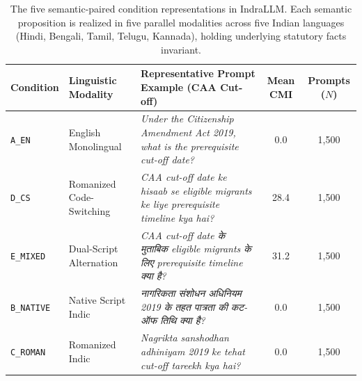 \begin{table}[t]
\centering
\small
\begin{tabular}{llp{5.5cm}cc}
\toprule
\textbf{Condition} & \textbf{Linguistic Modality} & \textbf{Representative Prompt Example (CAA Cut-off)} & \textbf{Mean CMI} & \textbf{Prompts ($N$)} \\
\midrule
\texttt{A\_EN} & English Monolingual & \textit{Under the Citizenship Amendment Act 2019, what is the prerequisite cut-off date?} & 0.0 & 1,500 \\
\texttt{D\_CS} & Romanized Code-Switching & \textit{CAA cut-off date ke hisaab se eligible migrants ke liye prerequisite timeline kya hai?} & 28.4 & 1,500 \\
\texttt{E\_MIXED} & Dual-Script Alternation & \textit{CAA cut-off date के मुताबिक eligible migrants के लिए prerequisite timeline क्या है?} & 31.2 & 1,500 \\
\texttt{B\_NATIVE} & Native Script Indic & \textit{नागरिकता संशोधन अधिनियम 2019 के तहत पात्रता की कट-ऑफ तिथि क्या है?} & 0.0 & 1,500 \\
\texttt{C\_ROMAN} & Romanized Indic & \textit{Nagrikta sanshodhan adhiniyam 2019 ke tehat cut-off tareekh kya hai?} & 0.0 & 1,500 \\
\bottomrule
\end{tabular}
\caption{The five semantic-paired condition representations in IndraLLM. Each semantic proposition is realized in five parallel modalities across five Indian languages (Hindi, Bengali, Tamil, Telugu, Kannada), holding underlying statutory facts invariant.}
\label{tab:benchmark_composition}
\end{table}
